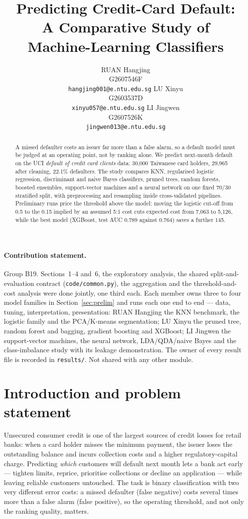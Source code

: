 \documentclass{article}
\title{Predicting Credit-Card Default:\\ A Comparative Study of\\ Machine-Learning Classifiers}
\author{%
  RUAN Hangjing\\
  G2607546F\\
  \texttt{hangjing001@e.ntu.edu.sg}
  \And
  LU Xinyu\\
  G2603537D\\
  \texttt{xinyu057@e.ntu.edu.sg}
  \And
  LI Jingwen\\
  G2607526K\\
  \texttt{jingwen013@e.ntu.edu.sg}
}
\begin{document}
\maketitle

\begin{abstract}
  A missed defaulter costs an issuer far more than a false alarm, so a default
  model must be judged at an operating point, not by ranking alone. We predict
  next-month default on the UCI \emph{default of credit card clients} data:
  30,000 Taiwanese card holders, 29,965 after cleaning, 22.1\% defaulters. The
  study compares KNN, regularised logistic regression, discriminant and naive
  Bayes classifiers, pruned trees, random forests, boosted ensembles,
  support-vector machines and a neural network on one fixed 70/30 stratified
  split, with preprocessing and resampling inside cross-validated pipelines.
  Preliminary runs price the threshold above the model: moving the logistic
  cut-off from 0.5 to the 0.15 implied by an assumed 5:1 cost cuts expected cost
  from 7{,}063 to 5{,}126, while the best model (XGBoost, test AUC 0.789 against
  0.764) saves a further 145.
\end{abstract}

\paragraph{Contribution statement.}
Group B19. Sections~1--4 and~6, the exploratory analysis, the shared split-and-evaluation
contract (\texttt{code/common.py}), the aggregation and the threshold-and-cost
analysis were done jointly, one third each. Each member owns three to four model
families in Section~\ref{sec:prelim} and runs each one end to end --- data,
tuning, interpretation, presentation: RUAN Hangjing the KNN benchmark, the
logistic family and the PCA/K-means segmentation; LU Xinyu the pruned tree,
random forest and bagging, gradient boosting and XGBoost; LI Jingwen the
support-vector machines, the neural network, LDA/QDA/naive Bayes and the
class-imbalance study with its leakage demonstration. The owner of every result
file is recorded in \texttt{results/}. Not shared with any other module.

\section{Introduction and problem statement}

Unsecured consumer credit is one of the largest sources of credit losses for
retail banks: when a card holder misses the minimum payment, the issuer loses the
outstanding balance and incurs collection costs and a higher regulatory-capital
charge. Predicting \emph{which} customers will default next month lets a bank act
early --- tighten limits, reprice, prioritise collections or decline an
application --- while leaving reliable customers untouched. The task is binary
classification with two very different error costs: a missed defaulter (false
negative) costs several times more than a false alarm (false positive), so the
operating threshold, and not only the ranking quality, matters.
\end{document}
